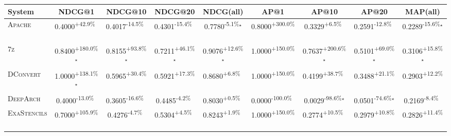 \begin{table}[htbp]
\centering
\renewcommand{\arraystretch}{1.2}
\begin{tabular}{l|cccc|cccc}
\hline
System & NDCG@1 & NDCG@10 & NDCG@20 & NDCG(all) & AP@1 & AP@10 & AP@20 & MAP(all) \\ \hline
\textsc{Apache} & \cellcolor{green!30}0.4000\textsuperscript{+42.9\%}$^{\,\,\,}$ & \cellcolor{red!30}0.4017\textsuperscript{-14.5\%}$^{\,\,\,}$ & \cellcolor{red!30}0.4301\textsuperscript{-15.4\%}$^{\,\,\,}$ & \cellcolor{red!30}0.7780\textsuperscript{-5.1\%}$^\star$ & \cellcolor{green!30}0.8000\textsuperscript{+300.0\%}$^{\,\,\,}$ & \cellcolor{green!30}0.3329\textsuperscript{+6.5\%}$^{\,\,\,}$ & \cellcolor{red!30}0.2591\textsuperscript{-12.8\%}$^{\,\,\,}$ & \cellcolor{red!30}0.2289\textsuperscript{-15.6\%}$^\star$ \\
\textsc{7z} & \cellcolor{green!30}0.8400\textsuperscript{+180.0\%}$^\star$ & \cellcolor{green!30}0.8155\textsuperscript{+93.8\%}$^\star$ & \cellcolor{green!30}0.7211\textsuperscript{+46.1\%}$^\star$ & \cellcolor{green!30}0.9076\textsuperscript{+12.6\%}$^\star$ & \cellcolor{green!30}1.0000\textsuperscript{+150.0\%}$^{\,\,\,}$ & \cellcolor{green!30}0.7637\textsuperscript{+200.6\%}$^\star$ & \cellcolor{green!30}0.5101\textsuperscript{+69.0\%}$^\star$ & \cellcolor{green!30}0.3106\textsuperscript{+15.8\%}$^\star$ \\
\textsc{DConvert} & \cellcolor{green!30}1.0000\textsuperscript{+138.1\%}$^\star$ & \cellcolor{green!30}0.5965\textsuperscript{+30.4\%}$^{\,\,\,}$ & \cellcolor{green!30}0.5921\textsuperscript{+17.3\%}$^{\,\,\,}$ & \cellcolor{green!30}0.8680\textsuperscript{+6.8\%}$^{\,\,\,}$ & \cellcolor{green!30}1.0000\textsuperscript{+150.0\%}$^{\,\,\,}$ & \cellcolor{green!30}0.4199\textsuperscript{+38.7\%}$^{\,\,\,}$ & \cellcolor{green!30}0.3488\textsuperscript{+21.1\%}$^{\,\,\,}$ & \cellcolor{green!30}0.2903\textsuperscript{+12.2\%}$^{\,\,\,}$ \\
\textsc{DeepArch} & \cellcolor{red!30}0.4000\textsuperscript{-13.0\%}$^{\,\,\,}$ & \cellcolor{red!30}0.3605\textsuperscript{-16.6\%}$^{\,\,\,}$ & \cellcolor{red!30}0.4485\textsuperscript{-4.2\%}$^{\,\,\,}$ & \cellcolor{green!30}0.8030\textsuperscript{+0.5\%}$^{\,\,\,}$ & \cellcolor{red!30}0.0000\textsuperscript{-100.0\%}$^{\,\,\,}$ & \cellcolor{red!30}0.0029\textsuperscript{-98.6\%}$^\star$ & \cellcolor{red!30}0.0501\textsuperscript{-74.6\%}$^\star$ & \cellcolor{red!30}0.2169\textsuperscript{-8.4\%}$^{\,\,\,}$ \\
\textsc{ExaStencils} & \cellcolor{green!30}0.7000\textsuperscript{+105.9\%}$^{\,\,\,}$ & \cellcolor{red!30}0.4276\textsuperscript{-4.7\%}$^{\,\,\,}$ & \cellcolor{green!30}0.5304\textsuperscript{+4.5\%}$^{\,\,\,}$ & \cellcolor{green!30}0.8243\textsuperscript{+1.9\%}$^{\,\,\,}$ & \cellcolor{green!30}1.0000\textsuperscript{+150.0\%}$^{\,\,\,}$ & \cellcolor{green!30}0.2774\textsuperscript{+10.5\%}$^{\,\,\,}$ & \cellcolor{green!30}0.2979\textsuperscript{+10.8\%}$^{\,\,\,}$ & \cellcolor{green!30}0.2826\textsuperscript{+11.4\%}$^{\,\,\,}$ \\

\end{tabular}
\end{table}
